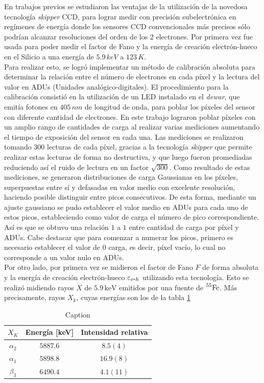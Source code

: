\noindent En trabajos previos\cite{Rodrigues} se estudiaron las ventajas de la utilización de la novedosa tecnología \textit{skipper} CCD, para lograr medir con precisión subelectrónica en regímenes de energía donde los sensores CCD convencionales más precisos sólo podrían alcanzar resoluciones del orden de los $2$ electrones. Por primera vez fue usada para poder medir el factor de Fano y la energía de creación electrón-hueco en el Silicio a una energía de $5.9\,\si{keV}$ a $123\,\si{K}$.\\
\indent Para realizar esto, se logró implementar un método de calibración absoluta para determinar la relación entre el número de electrones en cada píxel y la lectura del valor en ADUs (Unidades analógico-digitales). El procedimiento para la calibración consistió en la utilización de un LED instalado en el \textit{dewar}, que emitía fotones en $405\,\si{nm}$ de longitud de onda, para poblar los píxeles del sensor con diferente cantidad de electrones. En este trabajo lograron poblar píxeles con un amplio rango de cantidades de carga al realizar varias mediciones aumentando el tiempo de exposición del sensor en cada una. Las mediciones se realizaron tomando $300$ lecturas de cada píxel, gracias a la tecnología \textit{skipper} que permite realizar estas lecturas de forma no destructiva, y que luego fueron promediadas reduciendo así el ruido de lectura en un factor $\sqrt{300}$. Como resultado de estas mediciones, se generaron distribuciones de carga Gaussianas en los píxeles, superpuestas entre sí y defasadas en valor medio con excelente resolución, haciendo posible distinguir entre picos consecutivos. De esta forma, mediante un ajuste gaussiano se pudo establecer el valor medio en ADUs para cada uno de estos picos, estableciendo como valor de carga el número de pico correspondiente. Así es que se obtuvo una relación $1$ a $1$ entre cantidad de carga por píxel y ADUs. Cabe destacar que para comenzar a numerar los picos, primero es necesario establecer el valor de $0$ carga, es decir, píxel vacío, lo cual no corresponde a un valor nulo en ADUs. \\
\indent Por otro lado, por primera vez se midieron el factor de Fano $F$ de forma absoluta y la energía de creación electrón-hueco $\varepsilon_{e\mbox{-}h}$ utilizando esta tecnología. Esto se realizó midiendo rayos $X$ de $5.9\,\si{\mbox{keV}}$ emitidos por una fuente de $\prescript{55}{}{\mbox{Fe}}$. Más precisamente, rayos $X_{k}$, cuyas energías son los de la tabla \ref{tab:EnergiasXk}
\begin{table}[h]
\centering
\begin{tabular}{@{}ccc@{}}
\toprule
$X_{K}$      & Energía [keV] & Intensidad relativa \\ \hline \hline
$\alpha_{2}$ & $5887.6$      & $8.5 (4)$           \\
$\alpha_{1}$   & $5898.8$      & $16.9 (8)$          \\
$\beta_{3}$  & $6490.4$      & $4.1 (11)$          \\ \bottomrule
\end{tabular}
\caption{\footnotesize{Caption}}
\label{tab:EnergiasXk}
\end{table}
